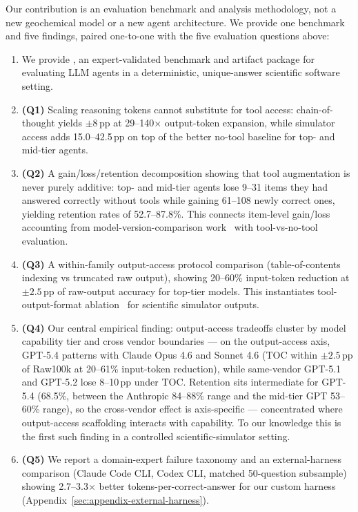 \documentclass{article}
\begin{document}
Our contribution is an evaluation benchmark and analysis methodology, not a new geochemical model or a new agent architecture. We provide one benchmark and five findings, paired one-to-one with the five evaluation questions above:
\begin{enumerate}[leftmargin=*, itemsep=2pt]
    \item We provide \BenchName, an expert-validated benchmark and artifact package for evaluating LLM agents in a deterministic, unique-answer scientific software setting.
    \item \textbf{(Q1)} Scaling reasoning tokens cannot substitute for tool access: chain-of-thought yields $\pm 8$\,pp at 29--140$\times$ output-token expansion, while simulator access adds 15.0--42.5\,pp on top of the better no-tool baseline for top- and mid-tier agents.
    \item \textbf{(Q2)} A gain/loss/retention decomposition showing that tool augmentation is never purely additive: top- and mid-tier agents lose 9--31 items they had answered correctly without tools while gaining 61--108 newly correct ones, yielding retention rates of 52.7--87.8\%. This connects item-level gain/loss accounting from model-version-comparison work~\citep{rci2026} with tool-vs-no-tool evaluation.
    \item \textbf{(Q3)} A within-family output-access protocol comparison (table-of-contents indexing vs truncated raw output), showing 20--60\% input-token reduction at $\pm 2.5$\,pp of raw-output accuracy for top-tier models. This instantiates tool-output-format ablation~\citep{toolouts2025} for scientific simulator outputs.
    \item \textbf{(Q4)} Our central empirical finding: output-access tradeoffs cluster by model capability tier and cross vendor boundaries --- on the output-access axis, GPT-5.4 patterns with Claude Opus 4.6 and Sonnet 4.6 (TOC within $\pm 2.5$\,pp of Raw100k at 20--61\% input-token reduction), while same-vendor GPT-5.1 and GPT-5.2 lose 8--10\,pp under TOC. Retention sits intermediate for GPT-5.4 (68.5\%, between the Anthropic 84--88\% range and the mid-tier GPT 53--60\% range), so the cross-vendor effect is axis-specific --- concentrated where output-access scaffolding interacts with capability. To our knowledge this is the first such finding in a controlled scientific-simulator setting.
    \item \textbf{(Q5)} We report a domain-expert failure taxonomy and an external-harness comparison (Claude Code CLI, Codex CLI, matched 50-question subsample) showing 2.7--3.3$\times$ better tokens-per-correct-answer for our custom harness (Appendix~\ref{sec:appendix-external-harness}).
\end{enumerate}
\end{document}
